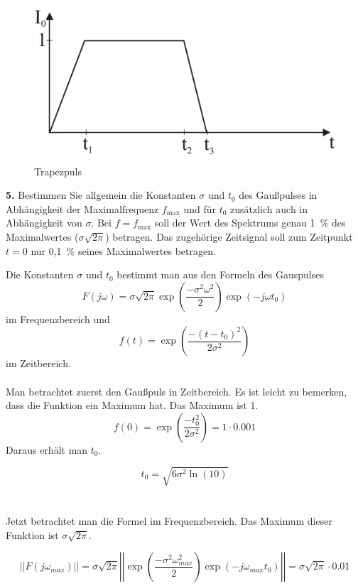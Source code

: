 \documentclass[Protokollheft.tex]{subfiles}
\begin{document}
\begin{figure}[ht]
	\centering
    \includegraphics[scale=0.9]{v7_trapez.pdf}
    \caption{Trapezpuls}\label{tra}
\end{figure}

\begin{framed}
	\noindent \textbf{5.} Bestimmen Sie allgemein die Konstanten $\sigma$ und $t_0$
des Gaußpulses in Abhängigkeit der Maximalfrequenz $f_{\text{max}}$ 
und für $t_0$ zusätzlich auch in Abhängigkeit von $\sigma$. Bei
$f=f_{\text{max}}$ soll der Wert des Spektrums genau 1~\% des
Maximalwertes ($\sigma\sqrt{2\pi}$) betragen. Das zugehörige
Zeitsignal soll zum Zeitpunkt $t=0$ nur 0,1~\% seines
Maximalwertes betragen.\label{exer:calcGaussConst}
\end{framed}
\noindent
Die Konstanten $\sigma$ und $t_0$ bestimmt man aus den Formeln des Gauspulses
$$ F(j\omega)=\sigma\sqrt{2\pi}\exp\left(\frac{-\sigma^2\omega^2}{2}\right)\exp\left(-j\omega t_0\right)$$ im Frequenzbereich und
$$
f(t)=\exp\left( \frac{-(t-t_0)^2}{2\sigma^2}         \right)
$$
im Zeitbereich.
\\
\\
Man betrachtet zuerst den Gaußpuls in Zeitbereich. Es ist leicht zu bemerken, dass die Funktion ein Maximum hat. Das Maximum ist 1.
$$f(0)=\exp\left( \frac{-t_0^2}{2\sigma^2}    \right)= 1 \cdot 0.001$$
Daraus erhält man $t_0$.

$$t_0 = \sqrt{6\sigma^2\ln(10)} $$
\\
\\
Jetzt betrachtet man die Formel im Frequenzbereich. Das Maximum dieser Funktion ist $\sigma\sqrt{2\pi}$.

$$ ||F(j\omega_{max})||=\sigma\sqrt{2\pi}\left|\left|\exp\left(\frac{-\sigma^2\omega_{max}^2}{2}\right)\exp\left(-j\omega_{max} t_0\right)\right|\right|=\sigma\sqrt{2\pi}\cdot 0.01$$
\end{document}
